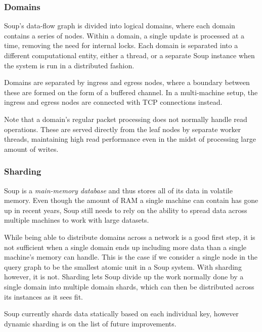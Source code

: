 \documentclass[b5paper]{report}
\begin{document}
\subsubsection{Domains}
Soup's data-flow graph is divided into logical domains, where each domain
contains a series of nodes. Within a domain, a single update is processed at a
time, removing the need for internal locks. Each domain is separated into a
different computational entity, either a thread, or a separate Soup instance when
the system is run in a distributed fashion.

Domains are separated by ingress and egress nodes, where a boundary between
these are formed on the form of a buffered channel. In a multi-machine setup,
the ingress and egress nodes are connected with TCP connections instead.

Note that a domain's regular packet processing does not normally handle read
operations. These are served directly from the leaf nodes by separate worker
threads, maintaining high read performance even in the midst of processing
large amount of writes.

\subsubsection{Sharding}
Soup is a \textit{main-memory database} and thus stores all of its data in
volatile memory. Even though the amount of RAM a single machine can contain has
gone up in recent years, Soup still needs to rely on the ability to spread data
across multiple machines to work with large datasets.

While being able to distribute domains across a network is a good first step, it
is not sufficient when a single domain ends up including more data than a single
machine's memory can handle. This is the case if we consider a single node in
the query graph to be the smallest atomic unit in a Soup system. With sharding
however, it is not. Sharding lets Soup divide up the work normally done by a
single domain into multiple domain shards, which can then be distributed across
its instances as it sees fit.

Soup currently shards data statically based on each individual key, however
dynamic sharding is on the list of future improvements.
\end{document}
